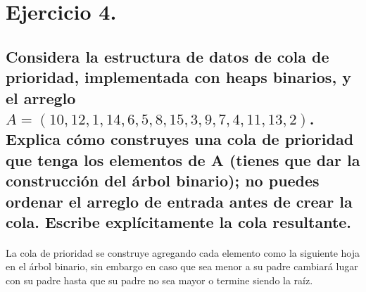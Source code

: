 \documentclass[12pt]{article}
\begin{document}
\section{Ejercicio 4. }
\subsection{Considera la estructura de datos de cola de prioridad, implementada con heaps binarios, y el arreglo $A=(10, 12, 1, 14, 6, 5, 8, 15, 3, 9, 7, 4, 11, 13, 2)$. Explica cómo construyes una cola de prioridad que tenga los elementos de A (tienes que dar la construcción del árbol binario); no puedes ordenar el arreglo de entrada antes de crear la cola. Escribe explícitamente la cola resultante.}
\paragraph{} La cola de prioridad se construye agregando cada elemento como la siguiente hoja en el árbol binario, sin embargo en caso que sea menor a su padre cambiará lugar con su padre hasta que su padre no sea mayor o termine siendo la raíz.
\end{document}
